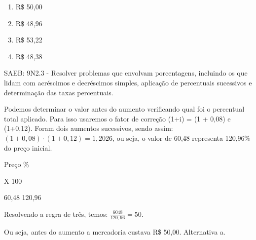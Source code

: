 \begin{escolha}
\begin{boxmedio}
\begin{boxmedio}
{\begin{boxpeq}
\begin{boxpeq}
{\begin{boxpeq}
\begin{boxmedio}
\begin{boxmedio}
\begin{boxpeq}
\begin{boxmedio}
\begin{boxpeq}
\begin{boxpeq}
\begin{boxpeq}
\begin{boxpeq}
\begin{boxmedio}
{\begin{boxmedio}
\begin{boxmedio}
\begin{boxpeq}
\begin{boxmedio}
\begin{boxpeq}
\begin{boxpeq}
\begin{boxpeq}
\begin{escolha}
{\begin{boxmedio}
\begin{boxpeq}
\begin{boxpeq}
\begin{boxpeq}
\begin{boxpeq}
\begin{boxpeq}
\begin{boxmedio}
\begin{boxpeq}
\begin{boxpeq}
\begin{boxpeq}
{\begin{boxpeq}
\begin{boxmedio}
\begin{boxpeq}
\begin{boxpeq}
\begin{boxpeq}
{\begin{boxpeq}
\begin{boxmedio}
{\begin{boxpeq}
\begin{boxpeq}
\begin{boxmedio}
\begin{boxmedio}
\begin{boxpeq}
\begin{boxpeq}
{\begin{boxpeq}
\begin{boxpeq}
\begin{boxpeq}
\begin{boxpeq}
\begin{boxpeq}
\begin{escolha}
\begin{escolha}
{\begin{boxmedio}
\begin{boxpeq}
\begin{q°}
\begin{boxmedio}
\begin{boxpeq}
\begin{boxpeq}
\begin{boxmedio}
\begin{boxmedio}
\begin{boxmedio}
\begin{boxmedio}
{\begin{escolha}
\begin{escolha}
\begin{escolha}
\begin{escolha}
\begin{escolha}
\begin{escolha}
{\begin{enumerate}
\item
  R\$ 50,00
\item
  R\$ 48,96
\item
  R\$ 53,22
\item
  R\$ 48,38
\end{enumerate}

SAEB: 9N2.3 - Resolver problemas que envolvam porcentagens, incluindo os
que lidam com acréscimos e decréscimos simples, aplicação de percentuais
sucessivos e determinação das taxas percentuais.

Podemos determinar o valor antes do aumento verificando qual foi o
percentual total aplicado. Para isso usaremos o fator de correção (1+i)
= (1 + 0,08) e (1+0,12). Foram dois aumentos sucessivos, sendo assim:
$\left( 1 + 0,08 \right) \cdot \left( 1 + 0,12 \right) = 1,2026$, ou
seja, o valor de 60,48 representa 120,96\% do preço inicial.

Preço \%

X 100

60,48 120,96

Resolvendo a regra de três, temos: $\frac{6048}{120,96} = 50$.

Ou seja, antes do aumento a mercadoria custava R\$ 50,00. Alternativa a.

}
\end{escolha}
\end{escolha}
\end{escolha}
\end{escolha}
\end{escolha}
\end{escolha}}
\end{boxmedio}
\end{boxmedio}
\end{boxmedio}
\end{boxmedio}
\end{boxpeq}
\end{boxpeq}
\end{boxmedio}
\end{q°}
\end{boxpeq}
\end{boxmedio}}
\end{escolha}
\end{escolha}
\end{boxpeq}
\end{boxpeq}
\end{boxpeq}
\end{boxpeq}
\end{boxpeq}}
\end{boxpeq}
\end{boxpeq}
\end{boxmedio}
\end{boxmedio}
\end{boxpeq}
\end{boxpeq}}
\end{boxmedio}
\end{boxpeq}}
\end{boxpeq}
\end{boxpeq}
\end{boxpeq}
\end{boxmedio}
\end{boxpeq}}
\end{boxpeq}
\end{boxpeq}
\end{boxpeq}
\end{boxmedio}
\end{boxpeq}
\end{boxpeq}
\end{boxpeq}
\end{boxpeq}
\end{boxpeq}
\end{boxmedio}}
\end{escolha}
\end{boxpeq}
\end{boxpeq}
\end{boxpeq}
\end{boxmedio}
\end{boxpeq}
\end{boxmedio}
\end{boxmedio}}
\end{boxmedio}
\end{boxpeq}
\end{boxpeq}
\end{boxpeq}
\end{boxpeq}
\end{boxmedio}
\end{boxpeq}
\end{boxmedio}
\end{boxmedio}
\end{boxpeq}}
\end{boxpeq}
\end{boxpeq}}
\end{boxmedio}
\end{boxmedio}
\end{escolha}
